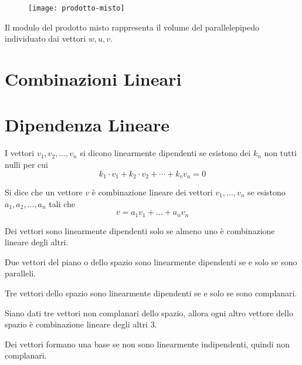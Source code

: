 \begin{figure}[H]
\texttt{[image: prodotto-misto]}
\centering
\end{figure}

Il modulo del prodotto misto rappresenta il volume del parallelepipedo individuato dai vettori $w, u, v$.

\section{Combinazioni Lineari}

\section{Dipendenza Lineare}

\begin{definition}
I vettori $v_1, v_2, \ldots, v_n$  si dicono linearmente dipendenti se esistono dei $k_n$ non tutti nulli per cui $$k_1 \cdot v_1 + k_2 \cdot v_2 + \cdots + k_v v_n = 0$$
\end{definition}

\begin{definition}
    Si dice che un vettore $v$ è combinazione lineare dei vettori $v_1, \ldots, v_n$ se esistono $a_1,a_2,\ldots,a_n$ tali che
    $$ v = a_1v_1 + \ldots + a_nv_n$$
\end{definition}

\begin{property}
Dei vettori sono linearmente dipendenti solo se almeno uno è combinazione lineare degli altri.
\end{property}


\begin{property}
Due vettori del piano o dello spazio sono linearmente dipendenti se e solo se sono paralleli.
\end{property}

\begin{property}
Tre vettori dello spazio sono linearmente dipendenti se e solo se sono complanari.
\end{property}

\begin{theorem}
Siano dati tre vettori non complanari dello spazio, allora ogni altro vettore dello spazio è combinazione lineare degli altri 3.
\end{theorem}

\begin{definition}
Dei vettori formano una base se non sono linearmente indipendenti, quindi non complanari.
\end{definition}


